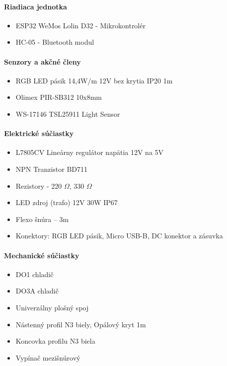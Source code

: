 \documentclass[12pt, a4paper]{article}
\begin{document}
\paragraph{Riadiaca jednotka}
\begin{itemize}
\itemsep0pt
\item ESP32 WeMos Lolin D32 - Mikrokontrolér
\item HC-05 - Bluetooth modul
\end{itemize}

\paragraph{Senzory a akčné členy}
\begin{itemize}
\itemsep0pt
\item RGB LED pásik 14,4W/m 12V bez krytia IP20 1m
\item Olimex PIR-SB312 10x8mm 
\item WS-17146 TSL25911 Light Sensor
\end{itemize}

\paragraph{Elektrické súčiastky}
\begin{itemize}
\itemsep0pt
\item L7805CV Lineárny regulátor napätia 12V na 5V
\item NPN Tranzistor BD711 
\item Rezistory - 220 $\Omega$, 330 $\Omega$
\item LED zdroj (trafo) 12V 30W IP67
\item Flexo šnúra – 3m
\item Konektory: RGB LED pásik, Micro USB-B, DC konektor a zásuvka
\end{itemize}

\paragraph{Mechanické súčiastky}
\begin{itemize}
\itemsep0pt
\item DO1 chladič
\item DO3A chladič
\item Univerzálny plošný spoj
\item Nástenný profil N3 biely, Opálový kryt 1m
\item Koncovka profilu N3 biela
\item Vypínač mezišnúrový
\end{itemize}
\end{document}
